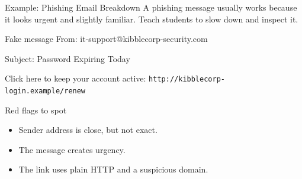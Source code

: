 \documentclass[aspectratio=169]{beamer}  %
\begin{document}
\begin{frame}{Example: Phishing Email Breakdown}
    \footnotesize
    A phishing message usually works because it looks urgent and slightly familiar. Teach students to slow down and inspect it.

    \vspace{0.4em}
    \begin{exampleblock}{Fake message}
        \scriptsize
        From: it-support@kibblecorp-security.com

        Subject: Password Expiring Today

        Click here to keep your account active: \texttt{http://kibblecorp-login.example/renew}
    \end{exampleblock}

    \begin{alertblock}{Red flags to spot}
        \begin{itemize}
            \item Sender address is close, but not exact.
            \item The message creates urgency.
            \item The link uses plain HTTP and a suspicious domain.
        \end{itemize}
    \end{alertblock}
\end{frame}
\end{document}
